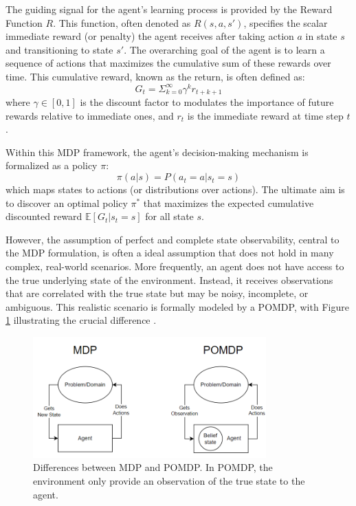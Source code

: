 The guiding signal for the agent's learning process is provided by the Reward Function \(R\). This function, often denoted as \(R(s, a, s')\), specifies the scalar immediate reward (or penalty) the agent receives after taking action \(a\) in state \(s\) and transitioning to state \(s'\). The overarching goal of the agent is to learn a sequence of actions that maximizes the cumulative sum of these rewards over time. This cumulative reward, known as the return, is often defined as:
\[G_t = \Sigma_{k=0}^\infty \gamma^k r_{t+k+1}\]
where \(\gamma \in [0,1]\) is the discount factor to modulates the importance of future rewards relative to immediate ones, and \(r_t\) is the immediate reward at time step \(t\).

Within this MDP framework, the agent's decision-making mechanism is formalized as a policy \(\pi\):
\[\pi(a|s) = P(a_t = a | s_t = s)\]
which maps states to actions (or distributions over actions). The ultimate aim is to discover an optimal policy \(\pi^*\) that maximizes the expected cumulative discounted reward \(\mathbb{E}[G_t | s_t = s]\) for all state \(s\).

However, the assumption of perfect and complete state observability, central to the \gls{MDP} formulation, is often a ideal assumption that does not hold in many complex, real-world scenarios. More frequently, an agent does not have access to the true underlying state of the environment. Instead, it receives observations that are correlated with the true state but may be noisy, incomplete, or ambiguous. This realistic scenario is formally modeled by a \gls{POMDP}, with Figure \ref{fig:MDP_POMDP} illustrating the crucial difference \cite{Blumenthal2024}.

\begin{figure}
\centering
\includegraphics[width=0.8\textwidth]{images/MDP_POMDP_comparison.png}
\caption{Differences between MDP and POMDP. In POMDP, the environment only provide an observation of the true state to the agent.}
\label{fig:MDP_POMDP}
\end{figure}

